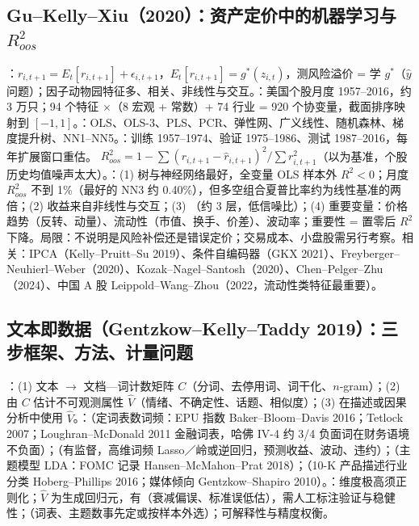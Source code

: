 \subsection{Gu–Kelly–Xiu（2020）：资产定价中的机器学习与 \texorpdfstring{$R^2_{oos}$}{R2oos}}
：$r_{i,t+1}=E_t[r_{i,t+1}]+\epsilon_{i,t+1}$，$E_t[r_{i,t+1}]=g^*(z_{i,t})$，测风险溢价 = 学 $g^*$（$\hat y$ 问题）；因子动物园特征多、相关、非线性与交互。：美国个股月度 1957–2016，约 3 万只；94 个特征 $\times$（8 宏观 + 常数）+ 74 行业 = 920 个协变量，截面排序映射到 $[-1,1]$。：OLS、OLS-3、PLS、PCR、弹性网、广义线性、随机森林、梯度提升树、NN1–NN5。：训练 1957–1974、验证 1975–1986、测试 1987–2016，每年扩展窗口重估。 $R^2_{oos}=1-\sum(r_{i,t+1}-\hat r_{i,t+1})^2/\sum r_{i,t+1}^2$（以为基准，个股历史均值噪声太大）。：(1) 树与神经网络最好，全变量 OLS 样本外 $R^2<0$；月度 $R^2_{oos}$ 不到 1\%（最好的 NN3 约 0.40\%），但多空组合夏普比率约为线性基准的两倍；(2) 收益来自非线性与交互；(3) （约 3 层，低信噪比）；(4) 重要变量：价格趋势（反转、动量）、流动性（市值、换手、价差）、波动率；重要性 = 置零后 $R^2$ 下降。局限：不说明是风险补偿还是错误定价；交易成本、小盘股需另行考察。相关：IPCA（Kelly–Pruitt–Su 2019）、条件自编码器（GKX 2021）、Freyberger–Neuhierl–Weber（2020）、Kozak–Nagel–Santosh（2020）、Chen–Pelger–Zhu（2024）、中国 A 股 Leippold–Wang–Zhou（2022，流动性类特征最重要）。

\subsection{文本即数据（Gentzkow–Kelly–Taddy 2019）：三步框架、方法、计量问题}
：(1) 文本 $\to$ 文档—词计数矩阵 $C$（分词、去停用词、词干化、$n$-gram）；(2) 由 $C$ 估计不可观测属性 $\hat V$（情绪、不确定性、话题、相似度）；(3) 在描述或因果分析中使用 $\hat V$。：（定词表数词频：EPU 指数 Baker–Bloom–Davis 2016；Tetlock 2007；Loughran–McDonald 2011 金融词表，哈佛 IV-4 约 3/4 负面词在财务语境不负面）；（有监督，高维词频 Lasso／岭或逆回归，预测收益、波动、违约）；（主题模型 LDA：FOMC 记录 Hansen–McMahon–Prat 2018）；（10-K 产品描述行业分类 Hoberg–Phillips 2016；媒体倾向 Gentzkow–Shapiro 2010）。：维度极高须正则化；$\hat V$ 为生成回归元，有（衰减偏误、标准误低估），需人工标注验证与稳健性；（词表、主题数事先定或按样本外选）；可解释性与精度权衡。

